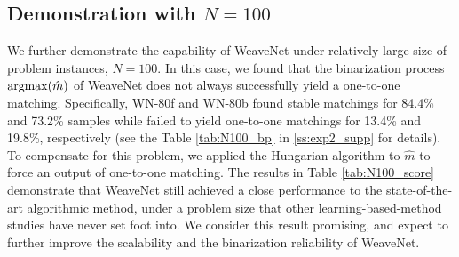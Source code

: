 \subsection{Demonstration with \texorpdfstring{$N=100$}{N=100}}
We further demonstrate the capability of WeaveNet under relatively large size of problem instances, $N=100$. In this case, we found that the binarization process ${\rm argmax}(\hat{m})$ of WeaveNet does not always successfully yield a one-to-one matching. Specifically, WN-80f and WN-80b found stable matchings for 84.4\% and 73.2\% samples while failed to yield one-to-one matchings for 13.4\% and 19.8\%, respectively (see the Table \ref{tab:N100_bp} in \ref{ss:exp2_supp} for details). To compensate for this problem, we applied the Hungarian algorithm to $\hat{m}$ to force an output of one-to-one matching. The results in Table \ref{tab:N100_score} demonstrate that WeaveNet still achieved a close performance to the state-of-the-art algorithmic method, under a problem size that other learning-based-method studies have never set foot into. We consider this result promising, and expect to further improve the scalability and the binarization reliability of WeaveNet.


